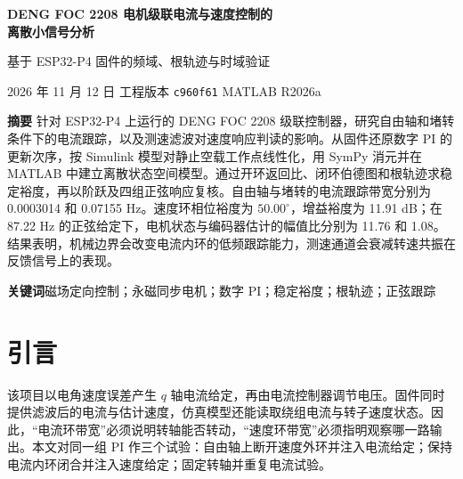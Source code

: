 \documentclass[UTF8,fontset=windows,11pt,a4paper]{ctexart}
\begin{document}
\thispagestyle{plain}
\begin{center}
{\fontsize{22}{30}\selectfont\bfseries DENG FOC 2208 电机级联电流与速度控制的\\离散小信号分析\par}
\vspace{3pt}
{\large 基于 ESP32-P4 固件的频域、根轨迹与时域验证\par}
\vspace{5pt}
{\small 2026 年 11 月 12 日 \quad 工程版本 \texttt{c960f61} \quad MATLAB R2026a}
\end{center}

\noindent\textbf{摘\quad 要}\quad
针对 ESP32-P4 上运行的 DENG FOC 2208 级联控制器，研究自由轴和堵转条件下的电流跟踪，以及测速滤波对速度响应判读的影响。从固件还原数字 PI 的更新次序，按 Simulink 模型对静止空载工作点线性化，用 SymPy 消元并在 MATLAB 中建立离散状态空间模型。通过开环返回比、闭环伯德图和根轨迹求稳定裕度，再以阶跃及四组正弦响应复核。自由轴与堵转的电流跟踪带宽分别为 0.0003014 和 0.07155 Hz。速度环相位裕度为 $50.00^\circ$，增益裕度为 11.91 dB；在 87.22 Hz 的正弦给定下，电机状态与编码器估计的幅值比分别为 11.76 和 1.08。结果表明，机械边界会改变电流内环的低频跟踪能力，测速通道会衰减转速共振在反馈信号上的表现。

\noindent\textbf{关键词}\quad 磁场定向控制；永磁同步电机；数字 PI；稳定裕度；根轨迹；正弦跟踪

\section{引言}
该项目以电角速度误差产生 $q$ 轴电流给定，再由电流控制器调节电压。固件同时提供滤波后的电流与估计速度，仿真模型还能读取绕组电流与转子速度状态\cite{firmware,model}。因此，“电流环带宽”必须说明转轴能否转动，“速度环带宽”必须指明观察哪一路输出。本文对同一组 PI 作三个试验：自由轴上断开速度外环并注入电流给定；保持电流内环闭合并注入速度给定；固定转轴并重复电流试验。
\end{document}
